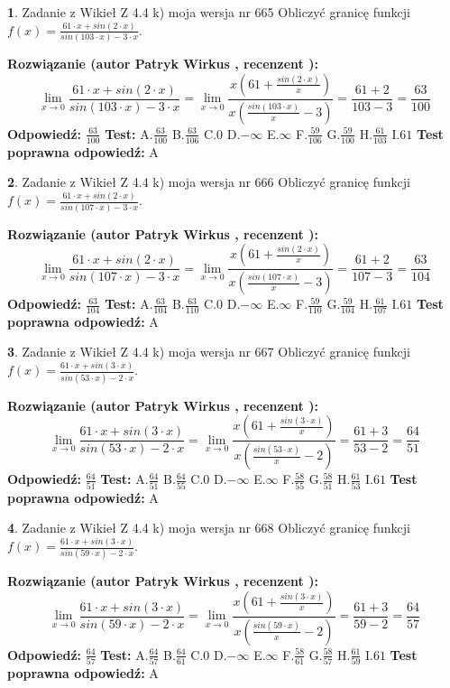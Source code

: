 \documentclass[12pt, a4paper]{article}
\theoremstyle{definition} %
\newtheorem{zad}{}
\newcommand{\zadStart}[1]{\begin{zad}#1\newline}
\newcommand{\zadStop}{\end{zad}}
\newcommand{\rozwStart}[2]{\noindent \textbf{Rozwiązanie (autor #1 , recenzent #2): }\newline}
\newcommand{\rozwStop}{\newline}
\newcommand{\odpStart}{\noindent \textbf{Odpowiedź:}\newline}
\newcommand{\odpStop}{\newline}
\newcommand{\testStart}{\noindent \textbf{Test:}\newline}
\newcommand{\testStop}{\newline}
\newcommand{\kluczStart}{\noindent \textbf{Test poprawna odpowiedź:}\newline}
\newcommand{\kluczStop}{\newline}
\begin{document}
\zadStart{Zadanie z Wikieł Z 4.4 k) moja wersja nr 665}
Obliczyć granicę funkcji $f(x)=\frac{61\cdot x +sin(2\cdot x)}{sin(103\cdot x) -3\cdot x}$.
\zadStop
\rozwStart{Patryk Wirkus}{}
$$\lim\limits_{x\to 0}\frac{61\cdot x +sin(2\cdot x)}{sin(103\cdot x) -3\cdot x}
=\lim\limits_{x\to 0}\frac{x(61+\frac{sin(2\cdot x)}{x})}{x(\frac{sin(103\cdot x)}{x}-3)}
=\frac{61+2}{103-3} = \frac{63}{100}$$
\rozwStop
\odpStart
$\frac{63}{100}$
\odpStop
\testStart
A.$\frac{63}{100}$
B.$\frac{63}{106}$
C.$0$
D.$-\infty$
E.$\infty$
F.$\frac{59}{106}$
G.$\frac{59}{100}$
H.$\frac{61}{103}$
I.$61$
\testStop
\kluczStart
A
\kluczStop



\zadStart{Zadanie z Wikieł Z 4.4 k) moja wersja nr 666}
Obliczyć granicę funkcji $f(x)=\frac{61\cdot x +sin(2\cdot x)}{sin(107\cdot x) -3\cdot x}$.
\zadStop
\rozwStart{Patryk Wirkus}{}
$$\lim\limits_{x\to 0}\frac{61\cdot x +sin(2\cdot x)}{sin(107\cdot x) -3\cdot x}
=\lim\limits_{x\to 0}\frac{x(61+\frac{sin(2\cdot x)}{x})}{x(\frac{sin(107\cdot x)}{x}-3)}
=\frac{61+2}{107-3} = \frac{63}{104}$$
\rozwStop
\odpStart
$\frac{63}{104}$
\odpStop
\testStart
A.$\frac{63}{104}$
B.$\frac{63}{110}$
C.$0$
D.$-\infty$
E.$\infty$
F.$\frac{59}{110}$
G.$\frac{59}{104}$
H.$\frac{61}{107}$
I.$61$
\testStop
\kluczStart
A
\kluczStop



\zadStart{Zadanie z Wikieł Z 4.4 k) moja wersja nr 667}
Obliczyć granicę funkcji $f(x)=\frac{61\cdot x +sin(3\cdot x)}{sin(53\cdot x) -2\cdot x}$.
\zadStop
\rozwStart{Patryk Wirkus}{}
$$\lim\limits_{x\to 0}\frac{61\cdot x +sin(3\cdot x)}{sin(53\cdot x) -2\cdot x}
=\lim\limits_{x\to 0}\frac{x(61+\frac{sin(3\cdot x)}{x})}{x(\frac{sin(53\cdot x)}{x}-2)}
=\frac{61+3}{53-2} = \frac{64}{51}$$
\rozwStop
\odpStart
$\frac{64}{51}$
\odpStop
\testStart
A.$\frac{64}{51}$
B.$\frac{64}{55}$
C.$0$
D.$-\infty$
E.$\infty$
F.$\frac{58}{55}$
G.$\frac{58}{51}$
H.$\frac{61}{53}$
I.$61$
\testStop
\kluczStart
A
\kluczStop



\zadStart{Zadanie z Wikieł Z 4.4 k) moja wersja nr 668}
Obliczyć granicę funkcji $f(x)=\frac{61\cdot x +sin(3\cdot x)}{sin(59\cdot x) -2\cdot x}$.
\zadStop
\rozwStart{Patryk Wirkus}{}
$$\lim\limits_{x\to 0}\frac{61\cdot x +sin(3\cdot x)}{sin(59\cdot x) -2\cdot x}
=\lim\limits_{x\to 0}\frac{x(61+\frac{sin(3\cdot x)}{x})}{x(\frac{sin(59\cdot x)}{x}-2)}
=\frac{61+3}{59-2} = \frac{64}{57}$$
\rozwStop
\odpStart
$\frac{64}{57}$
\odpStop
\testStart
A.$\frac{64}{57}$
B.$\frac{64}{61}$
C.$0$
D.$-\infty$
E.$\infty$
F.$\frac{58}{61}$
G.$\frac{58}{57}$
H.$\frac{61}{59}$
I.$61$
\testStop
\kluczStart
A
\kluczStop
\end{document}
